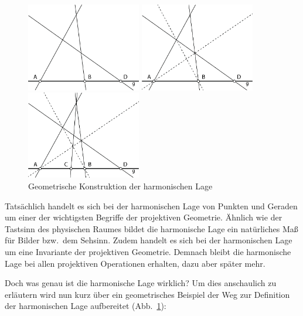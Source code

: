 \documentclass[12pt,a4paper]{article}
\begin{document}
\begin{figure}
\vspace{-25pt}
\centering
\includegraphics[width=5cm]{Bilder/herleitung1.png}

\vspace{0.5cm}
\centering
\includegraphics[width=5cm]{Bilder/herleitung2.png}

\vspace{0.5cm}
\centering
\includegraphics[width=5cm]{Bilder/herleitung3.png}
\caption{Geometrische Konstruktion der harmonischen Lage}
\label{fig:Herleitung}
\end{figure}

Tatsächlich handelt es sich bei der harmonischen Lage von Punkten und Geraden um einer der wichtigsten Begriffe der projektiven Geometrie. Ähnlich wie der Tastsinn des physischen Raumes bildet die harmonische Lage ein natürliches Maß für Bilder bzw.~dem Sehsinn. Zudem handelt es sich bei der harmonischen Lage um eine Invariante der projektiven Geometrie. Demnach bleibt die harmonische Lage bei allen projektiven Operationen erhalten, dazu aber später mehr.

Doch was genau ist die harmonische Lage wirklich? Um dies anschaulich zu erläutern wird nun kurz über ein geometrisches Beispiel der Weg zur Definition der harmonischen Lage aufbereitet (Abb.~\ref{fig:Herleitung}):
\end{document}
